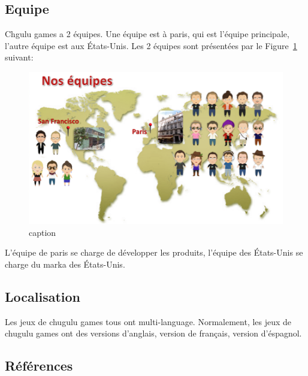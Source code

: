 
\subsection{Equipe} %

Chgulu games a 2 équipes. Une équipe est à paris, qui est l'équipe principale, l'autre équipe est aux États-Unis. Les 2 équipes sont présentées par le Figure~\ref{fig:Image_EquipeChugulu} suivant:

\begin{figure}[htbp]  \centering   \includegraphics[width=6in]{Image/EquipeChugulu.png}  \caption{caption}  \label{fig:Image_EquipeChugulu} \end{figure}

L'équipe de paris se charge de développer les produits, l'équipe des États-Unis se charge du marka des États-Unis. 


\subsection{Localisation} %

Les jeux de chugulu games tous ont multi-language. Normalement, les jeux de chugulu games ont des versions d'anglais, version de français, version d'éspagnol. 


\subsection{Références} %

